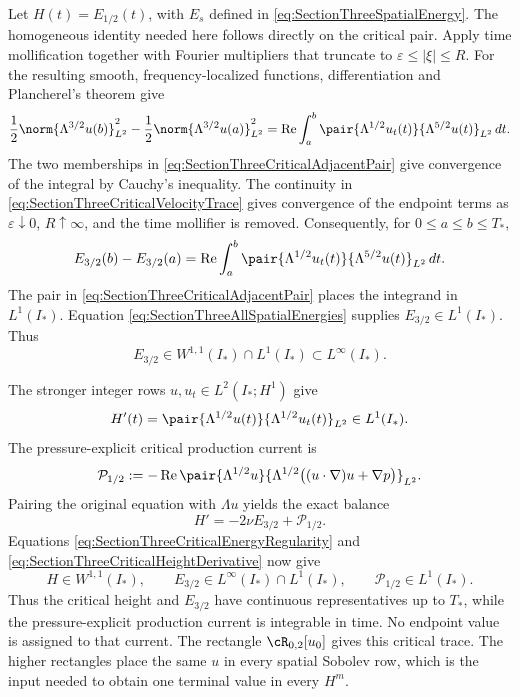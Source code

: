 Let \(H(t)=E_{1/2}(t)\), with \(E_s\) defined in \eqref{eq:SectionThreeSpatialEnergy}.
The homogeneous identity needed here follows directly on the critical pair.
Apply time mollification together with Fourier multipliers that truncate to
\(\varepsilon\leq|\xi|\leq R\).
For the resulting smooth, frequency-localized functions, differentiation and Plancherel's theorem give
\[
  \frac{1}{2}\norm{\Lambda^{3/2}u(b)}_{L^2}^{2}
  -\frac{1}{2}\norm{\Lambda^{3/2}u(a)}_{L^2}^{2}
  =
  \operatorname{Re}\int_a^b
  \pair{\Lambda^{1/2}u_t(t)}{\Lambda^{5/2}u(t)}_{L^2}
  \,dt.
\]
The two memberships in \eqref{eq:SectionThreeCriticalAdjacentPair} give convergence of the integral by Cauchy's inequality.
The continuity in \eqref{eq:SectionThreeCriticalVelocityTrace} gives convergence of the endpoint terms as \(\varepsilon\downarrow0\), \(R\uparrow\infty\), and the time mollifier is removed.
Consequently, for \(0\leq a\leq b\leq T_*\),
\[
  E_{3/2}(b)-E_{3/2}(a)
  =
  \operatorname{Re}\int_a^b
  \pair{\Lambda^{1/2}u_t(t)}{\Lambda^{5/2}u(t)}_{L^2}
  \,dt.
\]
The pair in \eqref{eq:SectionThreeCriticalAdjacentPair} places the integrand in \(L^1(I_*)\).
Equation \eqref{eq:SectionThreeAllSpatialEnergies} supplies \(E_{3/2}\in L^1(I_*)\).
Thus
\begin{equation}\label{eq:SectionThreeCriticalEnergyRegularity}
  E_{3/2}\in W^{1,1}(I_*)\cap L^1(I_*)
  \subset L^\infty(I_*).
\end{equation}

The stronger integer rows \(u,u_t\in L^2(I_*;H^1)\) give
\begin{equation}\label{eq:SectionThreeCriticalHeightDerivative}
  H'(t)
  =\pair{\Lambda^{1/2}u(t)}{\Lambda^{1/2}u_t(t)}_{L^2}
  \in L^1(I_*).
\end{equation}
The pressure-explicit critical production current is
\[
  \mathcal P_{1/2}
  :=
  -\operatorname{Re}
  \pair{\Lambda^{1/2}u}
  {\Lambda^{1/2}\bigl((u\cdot\nabla)u+\nabla p\bigr)}_{L^2}.
\]
Pairing the original equation with \(\Lambda u\) yields the exact balance
\[
  H'=-2\nu E_{3/2}+\mathcal P_{1/2}.
\]
Equations \eqref{eq:SectionThreeCriticalEnergyRegularity} and \eqref{eq:SectionThreeCriticalHeightDerivative} now give
\[
  H\in W^{1,1}(I_*),
  \qquad
  E_{3/2}\in L^\infty(I_*)\cap L^1(I_*),
  \qquad
  \mathcal P_{1/2}\in L^1(I_*).
\]
Thus the critical height and \(E_{3/2}\) have continuous representatives up to \(T_*\), while the pressure-explicit production current is integrable in time.
No endpoint value is assigned to that current.
The rectangle \(\cR_{0,2}[u_0]\) gives this critical trace.
The higher rectangles place the same \(u\) in every spatial Sobolev row, which is the input needed to obtain one terminal value in every \(H^m\).
